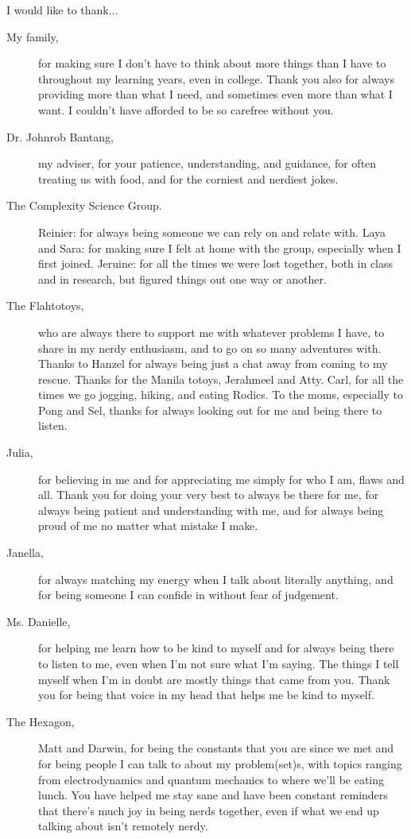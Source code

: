 I would like to thank...
\begin{description}
    \item[My family,] for making sure I don't have to think about more things than I have to throughout my learning years, even in college. Thank you also for always providing more than what I need, and sometimes even more than what I want. I couldn't have afforded to be so carefree without you.
    \item[Dr. Johnrob Bantang,] my adviser, for your patience, understanding, and guidance, for often treating us with food, and for the corniest and nerdiest jokes.
    \item[The Complexity Science Group.] Reinier: for always being someone we can rely on and relate with. Laya and Sara: for making sure I felt at home with the group, especially when I first joined. Jeruine: for all the times we were lost together, both in class and in research, but figured things out one way or another.
    \item[The Flahtotoys,] who are always there to support me with whatever problems I have, to share in my nerdy enthusiasm, and to go on so many adventures with. Thanks to Hanzel for always being just a chat away from coming to my rescue. Thanks for the Manila totoys, Jerahmeel and Atty. Carl, for all the times we go jogging, hiking, and eating Rodics. To the moms, especially to Pong and Sel, thanks for always looking out for me and being there to listen.
    \item[Julia,] for believing in me and for appreciating me simply for who I am, flaws and all. Thank you for doing your very best to always be there for me, for always being patient and understanding with me, and for always being proud of me no matter what mistake I make.
    \item[Janella,] for always matching my energy when I talk about literally anything, and for being someone I can confide in without fear of judgement.
    \item[Ms. Danielle,] for helping me learn how to be kind to myself and for always being there to listen to me, even when I'm not sure what I'm saying. The things I tell myself when I'm in doubt are mostly things that came from you. Thank you for being that voice in my head that helps me be kind to myself.
    \item[The Hexagon,] Matt and Darwin, for being the constants that you are since we met and for being people I can talk to about my problem(set)s, with topics ranging from electrodynamics and quantum mechanics to where we'll be eating lunch. You have helped me stay sane and have been constant reminders that there's much joy in being nerds together, even if what we end up talking about isn't remotely nerdy.

\end{description}
